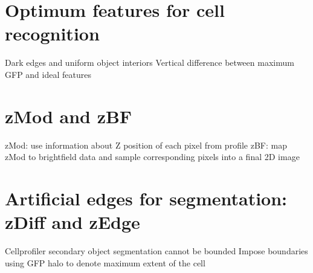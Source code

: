 \section{Optimum features for cell recognition}



Dark edges and uniform object interiors
Vertical difference between maximum GFP and ideal features

\section{zMod and zBF}

zMod: use information about Z position of each pixel from profile
zBF: map zMod to brightfield data and sample corresponding pixels into a final 2D image

\section{Artificial edges for segmentation: zDiff and zEdge}

Cellprofiler secondary object segmentation cannot be bounded
Impose boundaries using GFP halo to denote maximum extent of the cell
